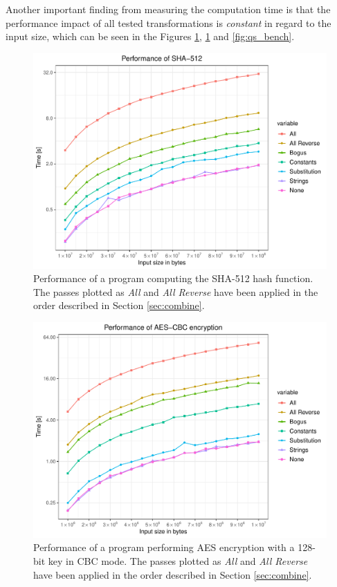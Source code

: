 \documentclass[
  digital, %
  notable,   %
  twoside, %
  nolof,     %
  nolot,     %
]{fithesis3}
\theoremstyle{definition}
\begin{document}
Another important finding from measuring the computation time is that the performance impact of all tested transformations is \textit{constant} in regard to the input size, which can be seen in the Figures \ref{fig:sha_bench}, \ref{fig:sha_bench} and \ref{fig:qs_bench}.

\begin{figure}[!h]
    \centering
    \includegraphics[height=0.38\textheight]{sha_bench.pdf}
    \caption{Performance of a program computing the SHA-512 hash function. The passes plotted as \textit{All} and \textit{All Reverse} have been applied in the order described in Section \ref{sec:combine}.}
    \label{fig:sha_bench}
\end{figure}

\begin{figure}[!h]
    \centering
    \includegraphics[height=0.38\textheight]{aes_bench.pdf}
    \caption{Performance of a program performing AES encryption with a 128-bit key in CBC mode. The passes plotted as \textit{All} and \textit{All Reverse} have been applied in the order described in Section \ref{sec:combine}.}
    \label{fig:aes_bench}
\end{figure}
\end{document}
